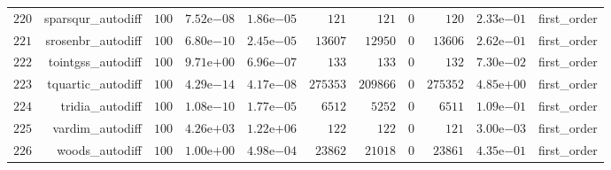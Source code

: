 \documentclass[varwidth=20cm,crop=true]{standalone}
\begin{document}
\begin{longtable}{rrrrrrrrrrr}
  \(   220\) & sparsqur\_autodiff & \(   100\) & \( 7.52\)e\(-08\) & \( 1.86\)e\(-05\) & \(   121\) & \(   121\) & \(     0\) & \(   120\) & \( 2.33\)e\(-01\) & first\_order \\
  \(   221\) & srosenbr\_autodiff & \(   100\) & \( 6.80\)e\(-10\) & \( 2.45\)e\(-05\) & \( 13607\) & \( 12950\) & \(     0\) & \( 13606\) & \( 2.62\)e\(-01\) & first\_order \\
  \(   222\) & tointgss\_autodiff & \(   100\) & \( 9.71\)e\(+00\) & \( 6.96\)e\(-07\) & \(   133\) & \(   133\) & \(     0\) & \(   132\) & \( 7.30\)e\(-02\) & first\_order \\
  \(   223\) & tquartic\_autodiff & \(   100\) & \( 4.29\)e\(-14\) & \( 4.17\)e\(-08\) & \(275353\) & \(209866\) & \(     0\) & \(275352\) & \( 4.85\)e\(+00\) & first\_order \\
  \(   224\) & tridia\_autodiff & \(   100\) & \( 1.08\)e\(-10\) & \( 1.77\)e\(-05\) & \(  6512\) & \(  5252\) & \(     0\) & \(  6511\) & \( 1.09\)e\(-01\) & first\_order \\
  \(   225\) & vardim\_autodiff & \(   100\) & \( 4.26\)e\(+03\) & \( 1.22\)e\(+06\) & \(   122\) & \(   122\) & \(     0\) & \(   121\) & \( 3.00\)e\(-03\) & first\_order \\
  \(   226\) & woods\_autodiff & \(   100\) & \( 1.00\)e\(+00\) & \( 4.98\)e\(-04\) & \( 23862\) & \( 21018\) & \(     0\) & \( 23861\) & \( 4.35\)e\(-01\) & first\_order \\\hline
\end{longtable}
\end{document}
